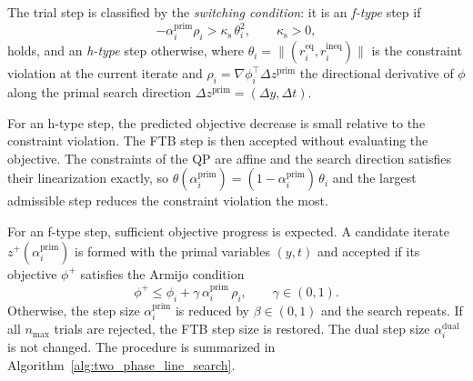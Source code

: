 \documentclass[class=scrbook, crop=false]{standalone}
\begin{document}
The trial step is classified by the \emph{switching condition}:
it is an \emph{f-type} step if
\begin{equation}
    \label{eq:switching}
    -\alpha_i^{\mathrm{prim}}\rho_i > \kappa_{\mathrm{s}}\,\theta_i^2, \qquad \kappa_{\mathrm{s}} > 0,
\end{equation}
holds, and an \emph{h-type} step otherwise,
where $\theta_i = \lVert (r_i^{\mathrm{eq}}, r_i^{\mathrm{ineq}}) \rVert$ is the constraint violation at the current iterate and
$\rho_i = \nabla \phi_i^\top \Delta z^{\mathrm{prim}}$ the directional derivative of $\phi$ along the primal search direction $\Delta z^{\mathrm{prim}} = (\Delta y, \Delta t)$.

For an h-type step, the predicted objective decrease is small relative to the constraint violation.
The \gls{FTB} step is then accepted without evaluating the objective.
The constraints of the \gls{QP} are affine and the search direction satisfies their linearization exactly,
so $\theta(\alpha_i^{\mathrm{prim}}) = (1-\alpha_i^{\mathrm{prim}})\,\theta_i$ 
and the largest admissible step reduces the constraint violation the most.

For an f-type step, sufficient objective progress is expected.
A candidate iterate $z^{+}(\alpha_i^{\mathrm{prim}})$ is formed with the primal variables $(y,t)$
and accepted if its objective $\phi^{+}$ satisfies the Armijo condition \cite{armijo1966minimization}
\begin{equation}
    \label{eq:armijo}
    \phi^{+} \le \phi_i + \gamma\,\alpha_i^{\mathrm{prim}}\,\rho_i, \qquad \gamma \in (0,1).
\end{equation}
Otherwise, the step size $\alpha_i^{\mathrm{prim}}$ is reduced by $\beta \in (0,1)$ and the search repeats.
If all $n_{\mathrm{max}}$ trials are rejected, the \gls{FTB} step size is restored.
The dual step size $\alpha_i^{\mathrm{dual}}$ is not changed.
The procedure is summarized in Algorithm~\ref{alg:two_phase_line_search}.
\end{document}
